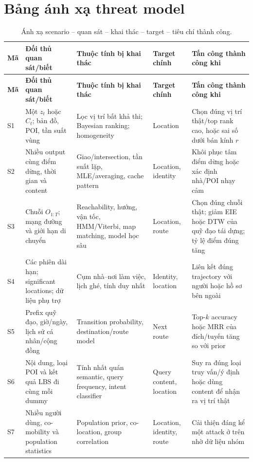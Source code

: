 \documentclass[12pt,a4paper,oneside]{report}
\begin{document}
\section{Bảng ánh xạ threat model}

\small
\begin{longtable}{P{1.15cm}P{3.0cm}P{3.1cm}P{2.6cm}P{2.8cm}}
\caption{Ánh xạ scenario -- quan sát -- khai thác -- target -- tiêu chí thành công.}
\label{tab:threatmap}\\
\toprule
\textbf{Mã} & \textbf{Đối thủ quan sát/biết} & \textbf{Thuộc tính bị khai thác} & \textbf{Target chính} & \textbf{Tấn công thành công khi} \\
\midrule
\endfirsthead
\toprule
\textbf{Mã} & \textbf{Đối thủ quan sát/biết} & \textbf{Thuộc tính bị khai thác} & \textbf{Target chính} & \textbf{Tấn công thành công khi} \\
\midrule
\endhead
S1 & Một $z_t$ hoặc $C_t$; bản đồ, POI, tần suất vùng & Lọc vị trí bất khả thi; Bayesian ranking; homogeneity & Location & Chọn đúng vị trí thật/top rank cao, hoặc sai số dưới bán kính $r$ \\
\addlinespace
S2 & Nhiều output cùng điểm dừng, thời gian và content & Giao/intersection, tần suất lặp, MLE/averaging, cache pattern & Location, identity & Khôi phục tâm điểm dừng hoặc xác định nhà/POI nhạy cảm \\
\addlinespace
S3 & Chuỗi $O_{1:T}$; mạng đường và giới hạn di chuyển & Reachability, hướng, vận tốc, HMM/Viterbi, map matching, model học sâu & Location, route & Chọn đúng chuỗi thật; giảm EIE hoặc DTW của quỹ đạo tái dựng; tỷ lệ điểm đúng tăng \\
\addlinespace
S4 & Các phiên dài hạn; significant locations; dữ liệu phụ trợ & Cụm nhà--nơi làm việc, lịch ghé, tính duy nhất & Identity, location & Liên kết đúng trajectory với người hoặc hồ sơ bên ngoài \\
\addlinespace
S5 & Prefix quỹ đạo, giờ/ngày, lịch sử cá nhân/cộng đồng & Transition probability, destination/route model & Next route & Top-$k$ accuracy hoặc MRR của đích/tuyến tăng so với prior \\
\addlinespace
S6 & Nội dung, loại POI và kết quả LBS đi cùng mỗi dummy & Tính nhất quán semantic, query frequency, intent classifier & Query content, location & Suy ra đúng loại truy vấn/ý định hoặc dùng content để nhận ra vị trí thật \\
\addlinespace
S7 & Nhiều người dùng, co-mobility và population statistics & Population prior, co-location, group correlation & Location, identity, route & Cải thiện đáng kể một attack ở trên nhờ dữ liệu nhóm \\
\bottomrule
\end{longtable}
\normalsize
\end{document}
